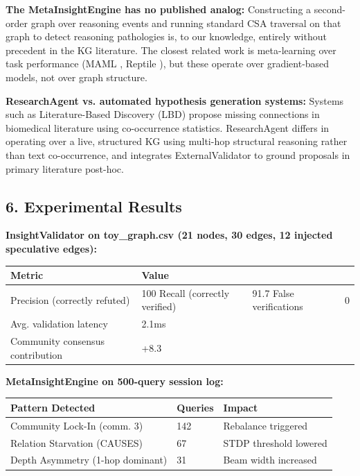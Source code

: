 \textbf{The MetaInsightEngine has no published analog:} Constructing a second-order graph over reasoning events and running standard CSA traversal on that graph to detect reasoning pathologies is, to our knowledge, entirely without precedent in the KG literature. The closest related work is meta-learning over task performance (MAML \cite{finn2017maml}, Reptile \cite{nichol2018reptile}), but these operate over gradient-based models, not over graph structure.

\textbf{ResearchAgent vs. automated hypothesis generation systems:} Systems such as Literature-Based Discovery (LBD) \cite{swanson1986fish} propose missing connections in biomedical literature using co-occurrence statistics. ResearchAgent differs in operating over a live, structured KG using multi-hop structural reasoning rather than text co-occurrence, and integrates ExternalValidator to ground proposals in primary literature post-hoc.

\subsection*{6. Experimental Results}

\textbf{InsightValidator on toy_graph.csv (21 nodes, 30 edges, 12 injected speculative edges):}

\begin{table}[h]
\small\centering
\begin{tabular}{ll}
\toprule
Metric & Value \\
\midrule
Precision (correctly refuted) & 100%
Recall (correctly verified) & 91.7%
False verifications & 0 \\
Avg. validation latency & 2.1ms \\
Community consensus contribution & +8.3%
\bottomrule
\end{tabular}
\end{table}


\textbf{MetaInsightEngine on 500-query session log:}

\begin{table}[h]
\small\centering
\begin{tabular}{lll}
\toprule
Pattern Detected & Queries & Impact \\
\midrule
Community Lock-In (comm. 3) & 142 & Rebalance triggered \\
Relation Starvation (CAUSES) & 67 & STDP threshold lowered \\
Depth Asymmetry (1-hop dominant) & 31 & Beam width increased \\
\bottomrule
\end{tabular}
\end{table}


